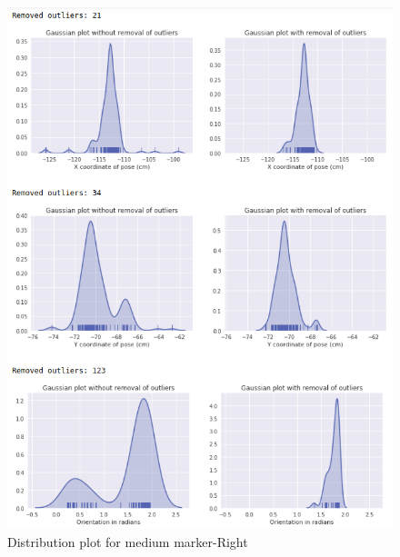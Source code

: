 \documentclass[11pt,a4paper]{article}
\begin{document}
\begin{enumerate}
\begin{figure}[H]
					\includegraphics[scale=0.56]{medium-right}
					\caption{Distribution plot for medium marker-Right}	
				\end{figure}
				

\end{enumerate}
\end{document}
